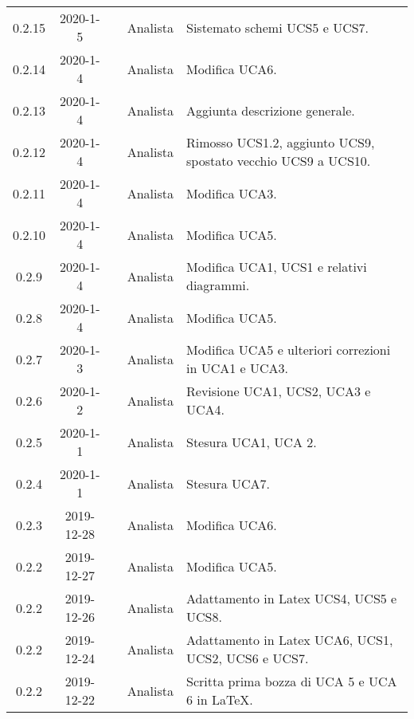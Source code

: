 {\begin{longtable}{ c c  C{4cm}  C{3cm} C{4cm}}
0.2.15 & 2020-1-5 & \PF{} & Analista & Sistemato schemi UCS5 e UCS7. \\

0.2.14 & 2020-1-4 & \PF{} & Analista & Modifica UCA6. \\

0.2.13 & 2020-1-4 & \CE{} & Analista & Aggiunta descrizione generale. \\

0.2.12 & 2020-1-4 & \CE{} & Analista & Rimosso UCS1.2, aggiunto UCS9, spostato vecchio UCS9 a UCS10. \\

0.2.11 & 2020-1-4 & \PF{} & Analista & Modifica UCA3. \\

0.2.10 & 2020-1-4 & \DF{} & Analista & Modifica UCA5. \\

0.2.9 & 2020-1-4 & \DF{} & Analista & Modifica UCA1, UCS1 e relativi diagrammi. \\

0.2.8 & 2020-1-4 & \CE{} & Analista & Modifica UCA5. \\

0.2.7 & 2020-1-3 & \CE{} & Analista & Modifica UCA5 e ulteriori correzioni in UCA1 e UCA3. \\

0.2.6 & 2020-1-2 & \CE{} & Analista & Revisione UCA1, UCS2, UCA3 e UCA4. \\

0.2.5 & 2020-1-1 & \BR{} & Analista & Stesura UCA1, UCA 2. \\

0.2.4 & 2020-1-1 & \PF{} & Analista & Stesura UCA7. \\

0.2.3 & 2019-12-28 & \DF{} & Analista & Modifica UCA6. \\

0.2.2 & 2019-12-27 & \PF{} & Analista & Modifica UCA5. \\

0.2.2 & 2019-12-26 & \CE{} & Analista & Adattamento in Latex UCS4, UCS5 e UCS8. \\

0.2.2 & 2019-12-24 & \DF{} & Analista & Adattamento in Latex UCA6, UCS1, UCS2, UCS6 e UCS7. \\

0.2.2 & 2019-12-22 & \PF{} & Analista & Scritta prima bozza di UCA 5 e UCA 6 in LaTeX. \\


\end{longtable}}
